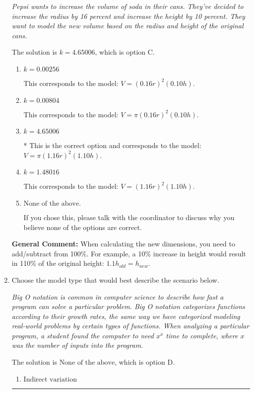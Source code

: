 \documentclass{extbook}[14pt]
\newcommand{\litem}[1]{\item #1

\rule{\textwidth}{0.4pt}}
\begin{document}
\begin{enumerate}
{\begin{center}
    \textit{ Pepsi wants to increase the volume of soda in their cans. They've decided to increase the radius by 16 percent and increase the height by 10 percent. They want to model the new volume based on the radius and height of the original cans. }
\end{center}
The solution is \( k = 4.65006 \), which is option C.\begin{enumerate}[label=\Alph*.]
\item \( k = 0.00256 \)

This corresponds to the model: $V = (0.16 r)^2 (0.10 h)$.
\item \( k = 0.00804 \)

This corresponds to the model: $V = \pi (0.16 r)^2 (0.10 h)$.
\item \( k = 4.65006 \)

* This is the correct option and corresponds to the model: $V = \pi (1.16 r)^2 (1.10 h)$.
\item \( k = 1.48016 \)

This corresponds to the model: $V = (1.16 r)^2 (1.10 h)$.
\item \( \text{None of the above.} \)

If you chose this, please talk with the coordinator to discuss why you believe none of the options are correct.
\end{enumerate}

\textbf{General Comment:} When calculating the new dimensions, you need to add/subtract from 100\%. For example, a 10\% increase in height would result in 110\% of the original height: $1.1h_{old} = h_{new}$.
}
\litem{
Choose the model type that would best describe the scenario below.

\begin{center}
    \textit{ Big O notation is common in computer science to describe how fast a program can solve a particular problem. Big O notation categorizes functions according to their growth rates, the same way we have categorized modeling real-world problems by certain types of functions. When analyzing a particular program, a student found the computer to need $x^x$ time to complete, where $x$ was the number of inputs into the program. }
\end{center}
The solution is \( \text{None of the above} \), which is option D.\begin{enumerate}[label=\Alph*.]
\item \( \text{Indirect variation} \)



\end{enumerate}}
\end{enumerate}
\end{document}
